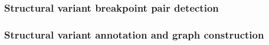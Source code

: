 

\subsubsection{Structural variant breakpoint pair detection}


\subsubsection{Structural variant annotation and graph construction}


